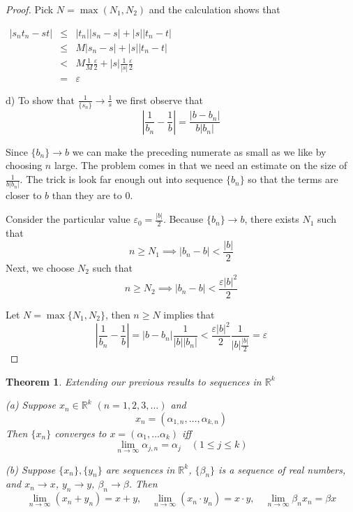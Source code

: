 \documentclass{tufte-book}
\newtheorem{theorem}{Theorem}[chapter]
\theoremstyle{definition}
\numberwithin{section}{chapter}
\begin{document}
\begin{proof}
Pick $N = \max(N_1, N_2)$ and the calculation shows that 

\smallskip

$\begin{array} {lcl} 
|s_n t_n  - st|& \leq &|t_n||s_n - s| + |s||t_n - t| \\ 
& \leq & M|s_n - s| + |s||t_n - t|\\
& <	&  M\frac{1}{M}\frac{\varepsilon}{2} + |s|\frac{1}{|s|}\frac{\varepsilon}{2}\\
&=& \varepsilon
    \end{array}$

\smallskip



d) To show that $\frac{1}{\{s_n\}} \to \frac{1}{s}$ we first observe that 
\[\left\lvert \frac{1}{b_n} - \frac{1}{b} \right\rvert = \frac{|b-b_n|} {b|b_n|}\]

Since $\{b_n\} \to b$ we can make the preceding numerate as small as we like by choosing $n$ large.  The problem comes in that we need an estimate on the size of $\frac{1} {b|b_n|}$. The trick is look far enough out into sequence $\{b_n\} $ so that the terms are closer to $b$ than they are to 0.

Consider the particular value $\varepsilon_0 = \frac{|b|}{2}$.  Because $\{b_n\} \to b$, there exists $N_1$ such that 
\[n \geq N_1 \implies |b_n - b|<\frac{|b|}{2}\]
Next, we choose $N_2$ such that 
\[n \geq N_2 \implies |b_n -b| < \frac{\varepsilon |b|^2}{2}\]

Let $N=\max\{N_1, N_2\}$, then $n \geq N$ implies that
\[\left\lvert \frac{1}{b_n} - \frac{1}{b} \right\rvert = |b-b_n|\frac{1} {|b||b_n|} < \frac{\varepsilon |b|^2}{2} \frac{1}{|b|\frac{|b|}{2}} = \varepsilon\]



\end{proof}

\begin{theorem} Extending our previous results to sequences in $\mathbb{R}^k$

(a) Suppose $x_n \in \mathbb{R}^k$ $(n=1,2,3,\ldots)$ and
\[x_n = (\alpha_{1,n}, \ldots, \alpha_{k,n})\]
Then $\{x_n\}$ converges to $x = (\alpha_1, \ldots \alpha_k)$ iff 
\[\lim_{n\to\infty}\alpha_{j,n} = \alpha_j \quad (1\leq j \leq k)\]

(b) Suppose $\{x_n\}, \{y_n\}$ are sequences in $\mathbb{R}^k$, $\{\beta_n\}$ is a sequence of real numbers, and $x_n \to x$, $y_n \to y$, $\beta_n \to \beta$. Then
\[\lim_{n\to\infty} (x_n + y_n ) = x+y, \quad \lim_{n\to\infty} (x_n \cdot y_n ) = x\cdot y,  \quad \lim_{n\to\infty} \beta_n x_n  = \beta x\]
\end{theorem}
\end{document}
